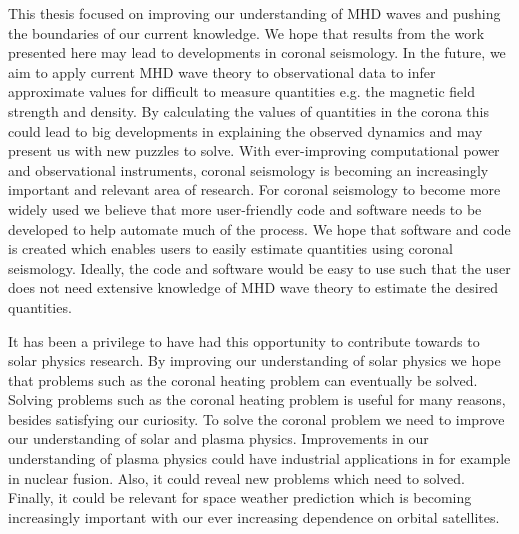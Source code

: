 This thesis focused on improving our understanding of MHD waves and pushing the boundaries of our current knowledge. We hope that results from the work presented here may lead to developments in coronal seismology. In the future, we aim to apply current MHD wave theory to observational data to infer approximate values for difficult to measure quantities e.g. the magnetic field strength and density. By calculating the values of quantities in the corona this could lead to big developments in explaining the observed dynamics and may present us with new puzzles to solve. With ever-improving computational power and observational instruments, coronal seismology is becoming an increasingly important and relevant area of research. For coronal seismology to become more widely used we believe that more user-friendly code and software needs to be developed to help automate much of the process. We hope that software and code is created which enables users to easily estimate quantities using coronal seismology. Ideally, the code and software would be easy to use such that the user does not need extensive knowledge of MHD wave theory to estimate the desired quantities. 

It has been a privilege to have had this opportunity to contribute towards to solar physics research. By improving our understanding of solar physics we hope that problems such as the coronal heating problem can eventually be solved. Solving problems such as the coronal heating problem is useful for many reasons, besides satisfying our curiosity. To solve the coronal problem we need to improve our understanding of solar and plasma physics. Improvements in our understanding of plasma physics could have industrial applications in for example in nuclear fusion. Also, it could reveal new problems which need to solved. Finally, it could be relevant for space weather prediction which is becoming increasingly important with our ever increasing dependence on orbital satellites.